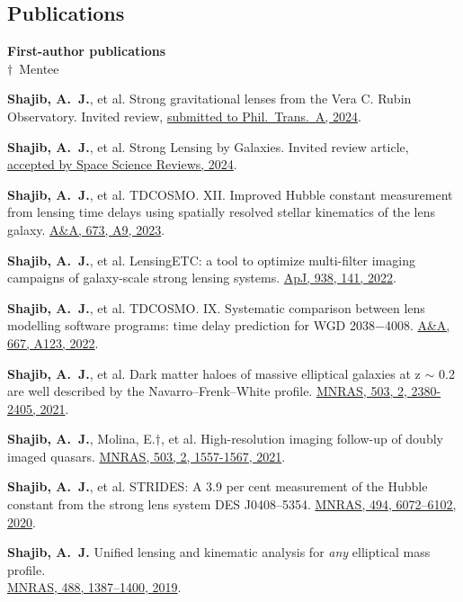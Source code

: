 \documentclass[margin, line]{res}
\begin{document}
\begin{resume}

\section{\sc Publications}
\textbf{First-author publications}
\newcommand{\mentee}{${\boldsymbol{\dagger}}$}
\\ \mentee\ Mentee
\begin{etaremune}
	\item \textbf{Shajib, A.~J.}, et al. Strong gravitational lenses from the Vera C. Rubin Observatory. Invited review, \href{https://ui.adsabs.harvard.edu/abs/2024arXiv240608919S/abstract}{submitted to Phil.~Trans.~A, 2024}.
	\item \textbf{Shajib, A.~J.}, et al. Strong Lensing by Galaxies. Invited review article, \href{https://ui.adsabs.harvard.edu/abs/2022arXiv221010790S/abstract}{accepted by Space Science Reviews, 2024}.
	\item \textbf{Shajib, A.~J.}, et al. TDCOSMO. XII. Improved Hubble constant measurement from lensing time delays using spatially resolved stellar kinematics of the lens galaxy. \href{https://ui.adsabs.harvard.edu/abs/2023arXiv230102656S/abstract}{A\&A, 673, A9, 2023}.
	\item \textbf{Shajib, A.~J.}, et al. LensingETC: a tool to optimize multi-filter imaging campaigns of galaxy-scale strong lensing systems. \href{https://doi.org/10.3847/1538-4357/ac927b}{ApJ, 938, 141, 2022}.
	\item \textbf{Shajib, A.~J.}, et al. TDCOSMO. IX. Systematic comparison between lens modelling software programs: time delay prediction for WGD 2038$-$4008. \href{https://arxiv.org/abs/2202.11101}{A\&A, 667, A123, 2022}.
	\item \textbf{Shajib, A.~J.}, et al. Dark matter haloes of massive elliptical galaxies at z $\sim$ 0.2 are well described by the Navarro--Frenk--White profile. \href{https://doi.org/10.1093/mnras/stab536}{MNRAS, 503, 2, 2380-2405, 2021}.
	\item \textbf{Shajib, A.~J.}, Molina, E.{\mentee}, et al. High-resolution imaging follow-up of doubly imaged quasars. \href{https://doi:10.1093/mnras/stab532}{MNRAS, 503, 2, 1557-1567, 2021}.
	\item \textbf{Shajib, A.~J.}, et al. STRIDES: A 3.9 per cent measurement of the Hubble constant from the strong lens system DES J0408--5354. \href{https://academic.oup.com/mnras/advance-article-abstract/doi/10.1093/mnras/staa828/5813265}{MNRAS, 494, 6072--6102, 2020}.
	\item \textbf{Shajib, A.~J.} Unified lensing and kinematic analysis for \textit{any} elliptical mass profile. \\ \href{https://doi.org/10.1093/mnras/stz1796}{MNRAS, 488, 1387--1400, 2019}.

\end{etaremune}
\end{resume}
\end{document}
